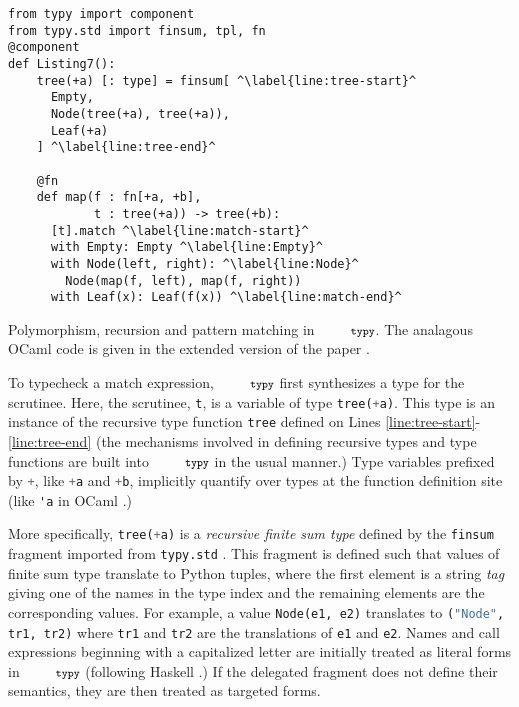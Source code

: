 \documentclass[10pt]{sigplanconf}
\newif\ifext
\newcommand{\typy}{\texttt{\footnotesize typy}}
\newcommand{\lip}[1]{\lstinline[language=Python,basicstyle=\ttfamily\footnotesize,morekeywords={with},deletendkeywords={tuple,buffer,map}]{#1}}
\newcommand{\li}[1]{\lip{#1}}
\begin{document}
\begin{codelisting}[t]
\vspace{-3px}
\begin{lstlisting}
from typy import component
from typy.std import finsum, tpl, fn
@component
def Listing7():
    tree(+a) [: type] = finsum[ ^\label{line:tree-start}^
      Empty, 
      Node(tree(+a), tree(+a)),
      Leaf(+a)
    ] ^\label{line:tree-end}^

    @fn
    def map(f : fn[+a, +b], 
            t : tree(+a)) -> tree(+b):
      [t].match ^\label{line:match-start}^
      with Empty: Empty ^\label{line:Empty}^
      with Node(left, right): ^\label{line:Node}^
        Node(map(f, left), map(f, right))
      with Leaf(x): Leaf(f(x)) ^\label{line:match-end}^
\end{lstlisting}
\caption{Polymorphism, recursion and pattern matching in $\typy$. The analagous OCaml code is given in \ifext Appendix \ref{sec:ocaml-examples}. \else the extended version of the paper \cite{gpce16tr}.\fi}
\label{fig:patterns}
\end{codelisting}

To typecheck a match expression, $\typy$ first synthesizes a type for the scrutinee. Here, the scrutinee, \li{t}, is a variable of type \li{tree(+a)}. This type is an instance of the recursive type function \li{tree} defined on Lines \ref{line:tree-start}-\ref{line:tree-end} (the mechanisms involved in defining recursive types and type functions are built into $\typy$ in the usual manner.) Type variables prefixed by \li{+}, like \li{+a} and \li{+b}, implicitly quantify over types at the function definition site (like \lstinline[language=ML]{'a} in OCaml \cite{ocaml-manual}.) 

More specifically, \li{tree(+a)} is a \emph{recursive finite sum type} defined by the \li{finsum} fragment imported from \li{typy.std} \cite{pfpl}. This fragment is defined such that values of finite sum type translate to Python tuples, where the first element is a string \emph{tag} giving one of the names in the type index and the remaining elements are the corresponding values. For example, a value \li{Node(e1, e2)} translates to \li{("Node", tr1, tr2)} where \li{tr1} and \li{tr2} are the translations of \li{e1} and \li{e2}. Names and call expressions beginning with a capitalized letter are initially treated as literal forms in $\typy$ (following Haskell \cite{jones2003haskell}.) If the delegated fragment does not define their semantics, they are then treated as targeted forms.
\end{document}
